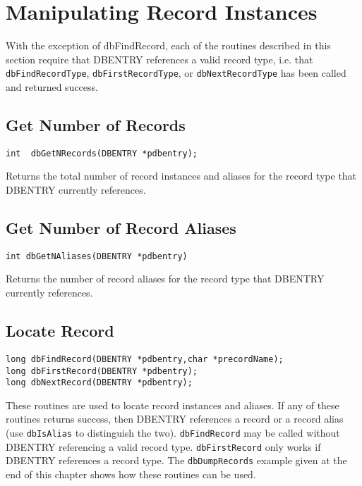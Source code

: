 \section{Manipulating Record Instances}

With the exception of dbFindRecord, each of the routines described in this section require that DBENTRY references a 
valid record type, i.e. that \verb|dbFindRecordType|, \verb|dbFirstRecordType|, or \verb|dbNextRecordType| has been called 
and returned success.

\subsection{Get Number of Records}

\begin{verbatim}
int  dbGetNRecords(DBENTRY *pdbentry);
\end{verbatim}

Returns the total number of record instances and aliases for the record type that DBENTRY currently references.

\subsection{Get Number of Record Aliases}

\begin{verbatim}
int dbGetNAliases(DBENTRY *pdbentry)
\end{verbatim}

Returns the number of record aliases for the record type that DBENTRY currently references.

\subsection{Locate Record}

\begin{verbatim}
long dbFindRecord(DBENTRY *pdbentry,char *precordName);
long dbFirstRecord(DBENTRY *pdbentry);
long dbNextRecord(DBENTRY *pdbentry);
\end{verbatim}

These routines are used to locate record instances and aliases. If any of these routines returns success, then DBENTRY 
references a record or a record alias (use \verb|dbIsAlias| to distinguish the two). \verb|dbFindRecord| may be called without 
DBENTRY referencing a valid record type. \verb|dbFirstRecord| only works if DBENTRY references a record type. The 
\verb|dbDumpRecords| example given at the end of this chapter shows how these routines can be used.

